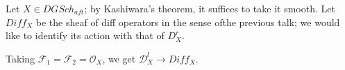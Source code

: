 Let $X \in DGSch_{aft}$; by Kashiwara's theorem, it suffices to take it smooth. Let $Diff_X$ be the sheaf of diff operators
in the sense ofthe previous talk; we would like to identify its action with that of $D_X^r$.


Taking $\mathcal{F}_1 = \mathcal{F}_2 = \mathcal{O}_X$, we get $\mathcal{D}_X^l \to Diff_X$.

